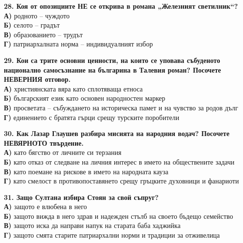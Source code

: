 \documentclass[12pt,a4paper]{article}
\begin{document}
\vspace{0.6cm}

\noindent
\textbf{28. Коя от опозициите НЕ се открива в романа „Железният светилник“?} \\
\noindent
\textbf{А)} родното -- чуждото \\
\textbf{Б)} селото -- градът \\
\textbf{В)} образованието -- трудът \\
\textbf{Г)} патриархалната норма -- индивидуалният избор

\vspace{0.6cm}

\noindent
\textbf{29. Кои са трите основни ценности, на които се уповава събуденото национално самосъзнание на българина в Талевия роман? Посочете НЕВЕРНИЯ отговор.} \\
\noindent
\textbf{А)} християнската вяра като сплотяваща етноса \\
\textbf{Б)} българският език като основен народностен маркер \\
\textbf{В)} просветата – събуждането на историческа памет и на чувство за родов дълг \\
\textbf{Г)} единението с братята гърци срещу турските поробители

\vspace{0.6cm}

\noindent
\textbf{30. Как Лазар Глаушев разбира мисията на народния водач? Посочете НЕВЯРНОТО твърдение.} \\
\noindent
\textbf{А)} като бягство от личните си терзания \\
\textbf{Б)} като отказ от следване на личния интерес в името на обществените задачи \\
\textbf{В)} като поемане на рискове в името на народната кауза \\
\textbf{Г)} като смелост в противопоставянето срещу гръцките духовници и фанариоти

\vspace{0.6cm}

\noindent
\textbf{31. Защо Султана избира Стоян за свой съпруг?} \\
\noindent
\textbf{А)} защото е влюбена в него \\
\textbf{Б)} защото вижда в него здрав и надежден стълб на своето бъдещо семейство \\
\textbf{В)} защото иска да направи напук на старата баба хаджийка \\
\textbf{Г)} защото смята старите патриархални норми и традиции за отживелица
\end{document}
